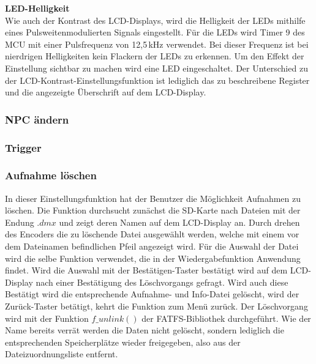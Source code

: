 \textbf{LED-Helligkeit}\\
Wie auch der Kontrast des LCD-Displays, wird die Helligkeit der LEDs mithilfe eines Pulsweitenmodulierten Signals eingestellt. Für die LEDs wird Timer 9 des MCU mit einer Pulsfrequenz von 12,5\,kHz verwendet. Bei dieser Frequenz ist bei nierdrigen Helligkeiten kein Flackern der LEDs zu erkennen. Um den Effekt der Einstellung sichtbar zu machen wird eine LED eingeschaltet. Der Unterschied zu der LCD-Kontrast-Einstellungsfunktion ist lediglich das zu beschreibene Register und die angezeigte Überschrift auf dem LCD-Display.
\subsubsection{NPC ändern}
\subsubsection{Trigger}
\subsubsection{Aufnahme löschen}
In dieser Einstellungsfunktion hat der Benutzer die Möglichkeit Aufnahmen zu löschen. Die Funktion durchsucht zunächst die SD-Karte nach Dateien mit der Endung $.dmx$ und zeigt deren Namen auf dem LCD-Display an. Durch drehen des Encoders die zu löschende Datei ausgewählt werden, welche mit einem vor dem Dateinamen befindlichen Pfeil angezeigt wird. Für die Auswahl der Datei wird die selbe Funktion verwendet, die in der Wiedergabefunktion Anwendung findet. Wird die Auswahl mit der Bestätigen-Taster bestätigt wird auf dem LCD-Display nach einer Bestätigung des Löschvorgangs gefragt. Wird auch diese Bestätigt wird die entsprechende Aufnahme- und Info-Datei gelöscht, wird der Zurück-Taster betätigt, kehrt die Funktion zum Menü zurück. Der Löschvorgang wird mit der Funktion $f\_unlink()$ der FATFS-Bibliothek durchgeführt. Wie der Name bereits verrät werden die Daten nicht gelöscht, sondern lediglich die entsprechenden Speicherplätze wieder freigegeben, also aus der Dateizuordnungsliste entfernt.